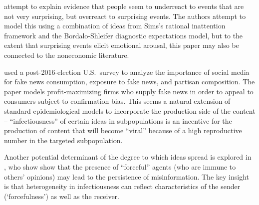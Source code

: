 \cite{kohlhasasymmetric} attempt to explain evidence that people seem to underreact to events that are not very surprising, but overreact to surprising events.  The authors attempt to model this using a combination of ideas from Sims's rational inattention framework and the Bordalo-Shleifer diagnostic expectations model, but to the extent that surprising events elicit emotional arousal, this paper may also be connected to the noneconomic literature.  %


 used a post-2016-election U.S.\ survey to analyze the importance of social media for fake news consumption, exposure to fake news, and partisan composition.  The paper models profit-maximizing firms who supply fake news in order to appeal to consumers subject to confirmation bias. This seems a natural extension of standard epidemiological models to incorporate the production side of the content -- ``infectiousness'' of certain ideas in subpopulations is an incentive for the production of content that will become ``viral'' because of a high reproductive number in the targeted subpopulation.

Another potential determinant of the degree to which ideas spread is explored in , who show show that the presence of ``forceful'' agents (who are immune to others' opinions) may lead to the persistence of misinformation. The key insight is that heterogeneity in infectiousness can reflect characteristics of the sender (`forcefulness') as well as the receiver.

